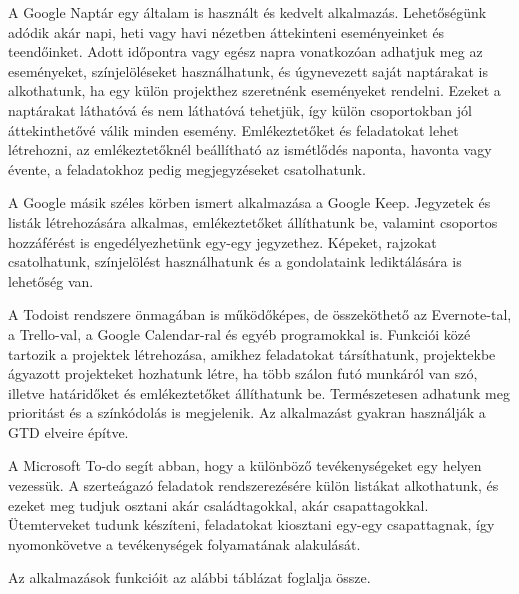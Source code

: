 


A Google Naptár egy általam is használt és kedvelt alkalmazás. Lehetőségünk adódik akár napi, heti vagy havi nézetben áttekinteni eseményeinket és teendőinket. Adott időpontra vagy egész napra vonatkozóan adhatjuk meg az eseményeket, színjelöléseket használhatunk, és úgynevezett saját naptárakat is alkothatunk, ha egy külön projekthez szeretnénk eseményeket rendelni. Ezeket a naptárakat láthatóvá és nem láthatóvá tehetjük, így külön csoportokban jól áttekinthetővé válik minden esemény. Emlékeztetőket és feladatokat lehet létrehozni, az emlékeztetőknél beállítható az ismétlődés naponta, havonta vagy évente, a feladatokhoz pedig megjegyzéseket csatolhatunk.

A Google másik széles körben ismert alkalmazása a Google Keep. Jegyzetek és listák létrehozására alkalmas, emlékeztetőket állíthatunk be, valamint csoportos hozzáférést is engedélyezhetünk egy-egy jegyzethez. Képeket, rajzokat csatolhatunk, színjelölést használhatunk és a gondolataink lediktálására is lehetőség van.


A Todoist rendszere önmagában is működőképes, de összeköthető az Evernote-tal, a Trello-val, a Google Calendar-ral és egyéb programokkal is. Funkciói közé tartozik a projektek létrehozása, amikhez feladatokat társíthatunk, projektekbe ágyazott projekteket hozhatunk létre, ha több szálon futó munkáról van szó, illetve határidőket és emlékeztetőket állíthatunk be. Természetesen adhatunk meg prioritást és a színkódolás is megjelenik. Az alkalmazást gyakran használják a GTD elveire építve.

A Microsoft To-do segít abban, hogy a különböző tevékenységeket egy helyen vezessük. A szerteágazó feladatok rendszerezésére külön listákat alkothatunk, és ezeket meg tudjuk osztani akár családtagokkal, akár csapattagokkal. Ütemterveket tudunk készíteni, feladatokat kiosztani egy-egy csapattagnak, így nyomonkövetve a tevékenységek folyamatának alakulását.

Az alkalmazások funkcióit az alábbi táblázat foglalja össze.

